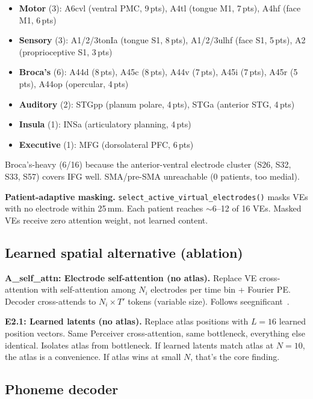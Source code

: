 \documentclass[11pt,letterpaper]{article}
\begin{document}
\begin{itemize}[leftmargin=2em]
\item \textbf{Motor} (3): A6cvl (ventral PMC, 9\,pts), A4tl (tongue M1, 7\,pts), A4hf (face M1, 6\,pts)
\item \textbf{Sensory} (3): A1/2/3tonIa (tongue S1, 8\,pts), A1/2/3ulhf (face S1, 5\,pts), A2 (proprioceptive S1, 3\,pts)
\item \textbf{Broca's} (6): A44d (8\,pts), A45c (8\,pts), A44v (7\,pts), A45i (7\,pts), A45r (5\,pts), A44op (opercular, 4\,pts)
\item \textbf{Auditory} (2): STGpp (planum polare, 4\,pts), STGa (anterior STG, 4\,pts)
\item \textbf{Insula} (1): INSa (articulatory planning, 4\,pts)
\item \textbf{Executive} (1): MFG (dorsolateral PFC, 6\,pts)
\end{itemize}

Broca's-heavy (6/16) because the anterior-ventral electrode cluster (S26, S32, S33, S57) covers IFG well. SMA/pre-SMA unreachable (0 patients, too medial).

\textbf{Patient-adaptive masking.} \texttt{select\_active\_virtual\_electrodes()} masks VEs with no electrode within 25\,mm. Each patient reaches ${\sim}$6--12 of 16 VEs. Masked VEs receive zero attention weight, not learned content.


\subsection{Learned spatial alternative (ablation)}\label{sec:learned-spatial}

\textbf{A\_self\_attn: Electrode self-attention (no atlas).} Replace VE cross-attention with self-attention among $N_i$ electrodes per time bin + Fourier PE. Decoder cross-attends to $N_i \times T'$ tokens (variable size). Follows seegnificant~\cite{mentzelopoulos2024}.

\textbf{E2.1: Learned latents (no atlas).} Replace atlas positions with $L{=}16$ learned position vectors. Same Perceiver cross-attention, same bottleneck, everything else identical. Isolates atlas from bottleneck. If learned latents match atlas at $N{=}10$, the atlas is a convenience. If atlas wins at small $N$, that's the core finding.


\subsection{Phoneme decoder}\label{sec:phoneme-decoder}
\end{document}
